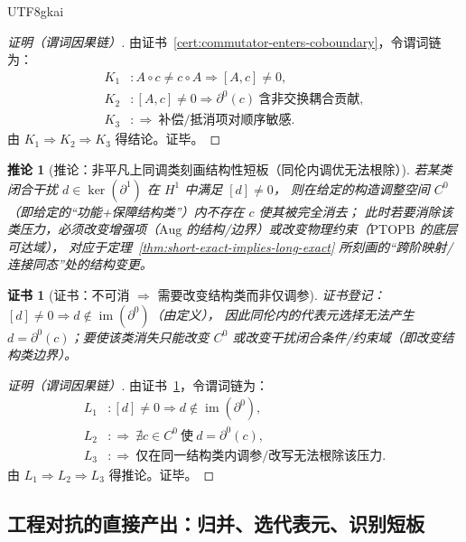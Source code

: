 \documentclass[12pt]{article}
\newtheorem{corollary}{推论}[section]
\newtheorem{Certificate}{证书}[section]
\newcommand{\PTOPB}{\ensuremath{\mathrm{PTOPB}}}
\newcommand{\Aug}{\ensuremath{\mathrm{Aug}}}
\begin{document}
\begin{CJK*}{UTF8}{gkai}
\begin{proof}[证明（谓词因果链）]
由证书~\ref{cert:commutator-enters-coboundary}，令谓词链为：
\[
\begin{aligned}
  K_1 &: A\circ c\neq c\circ A\Rightarrow [A,c]\neq 0,\\
  K_2 &: [A,c]\neq 0\Rightarrow \partial^0(c)\ \text{含非交换耦合贡献},\\
  K_3 &: \Rightarrow\ \text{补偿/抵消项对顺序敏感}.
\end{aligned}
\]
由 $K_1\Rightarrow K_2\Rightarrow K_3$ 得结论。证毕。
\end{proof}

\begin{corollary}[推论：非平凡上同调类刻画结构性短板（同伦内调优无法根除）]
\label{cor:nontrivial-cohomology-is-structural}
若某类闭合干扰 $d\in\ker(\partial^1)$ 在 $H^1$ 中满足 $[d]\neq 0$，
则在给定的构造调整空间 $C^0$（即给定的“功能+保障结构类”）内不存在 $c$ 使其被完全消去；
此时若要消除该类压力，必须改变增强项（\Aug{} 的结构/边界）或改变物理约束（\PTOPB{} 的底层可达域），
对应于定理~\ref{thm:short-exact-implies-long-exact} 所刻画的“跨阶映射/连接同态”处的结构变更。
\end{corollary}

\begin{Certificate}[证书：不可消 $\Rightarrow$ 需要改变结构类而非仅调参]
\label{cert:nontrivial-cohomology-is-structural}
证书登记：$[d]\neq 0\Rightarrow d\notin\operatorname{im}(\partial^0)$（由定义），
因此同伦内的代表元选择无法产生 $d=\partial^0(c)$；要使该类消失只能改变 $C^0$ 或改变干扰闭合条件/约束域（即改变结构类边界）。
\end{Certificate}

\begin{proof}[证明（谓词因果链）]
由证书~\ref{cert:nontrivial-cohomology-is-structural}，令谓词链为：
\[
\begin{aligned}
  L_1 &: [d]\neq 0\Rightarrow d\notin\operatorname{im}(\partial^0),\\
  L_2 &: \Rightarrow\ \nexists c\in C^0\ \text{使}\ d=\partial^0(c),\\
  L_3 &: \Rightarrow\ \text{仅在同一结构类内调参/改写无法根除该压力}.
\end{aligned}
\]
由 $L_1\Rightarrow L_2\Rightarrow L_3$ 得推论。证毕。
\end{proof}

\subsection{工程对抗的直接产出：归并、选代表元、识别短板}
\label{sec:engineering-outcomes}


\end{CJK*}
\end{document}
